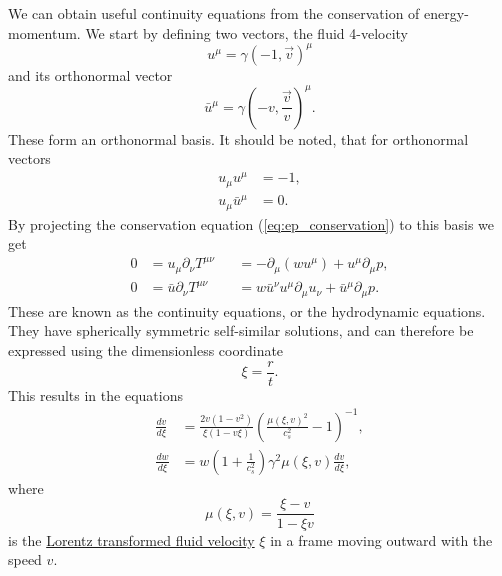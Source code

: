 We can obtain useful continuity equations from the conservation of energy-momentum.
We start by defining two vectors, the fluid 4-velocity
\begin{equation}
u^\mu = \gamma(-1, \overrightarrow{v})^\mu
\end{equation}
and its orthonormal vector
\begin{equation}
\bar{u}^\mu = \gamma(-v, \frac{\overrightarrow{v}}{v})^\mu.
\end{equation}
These form an orthonormal basis.
It should be noted, that for orthonormal vectors
\begin{align}
u_\mu u^\mu &= -1, \\
u_\mu \bar{u}^\mu &= 0.
\end{align}
By projecting the conservation equation (\ref{eq:ep_conservation}) to this basis we get
\cite[eq. 7.28-7.29]{lecture_notes}
\begin{align}
0 &= u_\mu \partial_\nu T^{\mu \nu}   &&= -\partial_\mu (w u^\mu) + u^\mu \partial_\mu p, \\
0 &= \bar{u} \partial_\nu T^{\mu \nu} &&= w \bar{u}^\nu u^\mu \partial_\mu u_\nu + \bar{u}^\mu \partial_\mu p.
\end{align}
These are known as the continuity equations, or the hydrodynamic equations. 
They have spherically symmetric self-similar solutions, and can therefore be expressed using the dimensionless coordinate
\begin{equation}
\xi = \frac{r}{t}.
\end{equation}
This results in the equations
\cites[eq. 7.30-7.31]{lecture_notes}[eq. 5]{giese_2021}
\begin{align}
\frac{dv}{d\xi} &= \frac{2v(1-v^2)}{\xi(1-v\xi)} \left( \frac{\mu(\xi,v)^2}{c_s^2} - 1 \right)^{-1},
\label{eq:hydro1}
\\
\frac{dw}{d\xi} &= w \left( 1 + \frac{1}{c_s^2} \right) \gamma^2 \mu(\xi,v) \frac{dv}{d\xi},
\label{eq:hydro2}
\end{align}
where
\begin{equation}
\mu(\xi,v) = \frac{\xi - v}{1 - \xi v}
\end{equation}
is the
\href{https://en.wikipedia.org/wiki/Velocity-addition_formula#Standard_configuration}{Lorentz transformed fluid velocity}
$\xi$ in a frame moving outward with the speed $v$.

